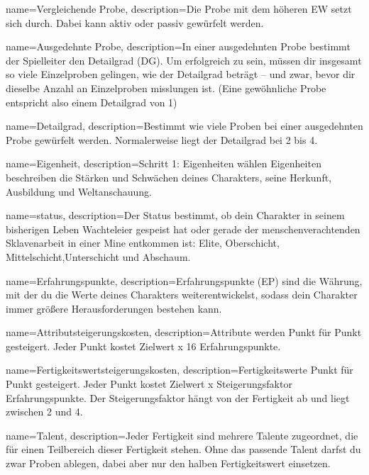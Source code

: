 {
    name={Vergleichende Probe},
    description={Die Probe mit dem höheren EW setzt sich durch. Dabei kann aktiv oder passiv gewürfelt werden.}}
        
{
    name={Ausgedehnte Probe},
    description={In einer ausgedehnten Probe bestimmt der Spielleiter den Detailgrad (DG). Um erfolgreich zu sein, müssen dir insgesamt so viele Einzelproben gelingen, wie der Detailgrad beträgt – und zwar, bevor dir dieselbe Anzahl an Einzelproben
misslungen ist. (Eine gewöhnliche Probe entspricht also einem Detailgrad von 1)}
}

{
    name={Detailgrad},
    description={Bestimmt wie viele Proben bei einer ausgedehnten Probe gewürfelt werden. Normalerweise liegt der Detailgrad bei 2 bis 4.}}

{
    name={Eigenheit},
    description={Schritt 1: Eigenheiten wählen Eigenheiten beschreiben die Stärken und Schwächen deines Charakters, seine Herkunft, Ausbildung und Weltanschauung.}}

{
    name={status},
    description={Der Status bestimmt, ob dein Charakter in seinem bisherigen Leben Wachteleier gespeist hat oder gerade der menschen­verachtenden Sklavenarbeit in einer Mine entkommen ist: Elite, Oberschicht, Mittelschicht,Unterschicht und Abschaum.}}

{
    name={Erfahrungspunkte},
    description={Erfahrungspunkte (EP) sind die Währung, mit der du die Werte deines Charakters weiterentwickelst, sodass dein Charakter immer größere Herausforderungen bestehen kann.}}

{
    name={Attributsteigerungskosten},
    description={Attribute werden Punkt für Punkt gesteigert. Jeder Punkt
kostet Zielwert x 16 Erfahrungspunkte.}}

{
    name={Fertigkeitswertsteigerungskosten},
    description={Fertigkeits­werte Punkt für Punkt gesteigert. Jeder Punkt kostet Zielwert x Steigerungsfaktor Erfahrungspunkte. Der Steigerungsfaktor hängt von der Fertigkeit ab und liegt zwischen 2 und 4.}}

{
    name={Talent},
    description={Jeder Fertigkeit sind mehrere Talente zugeordnet, die für einen Teilbereich dieser Fertigkeit stehen. Ohne das passende Talent darfst du zwar Proben ablegen, dabei aber nur den halben Fertigkeitswert einsetzen.}}

